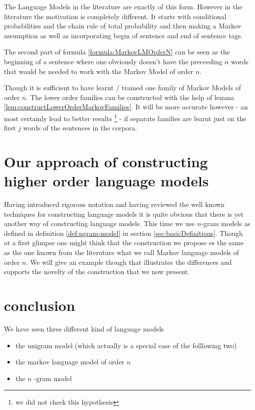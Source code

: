\documentclass[•]{book}
\begin{document}
\begin{remark}
The Language Models in the literature are exactly of this form.
However in the literature the motivation is completely different. 
It starts with conditional probabilities and the chain rule of total probability and then making a Markov assumption as well as incorporating begin of sentence and end of sentence tags. 

The second part of formula \ref{formula:MarkovLMOrderN} can be seen as the beginning of a sentence where one obviously doesn't have the preceeding $n$ words that would be needed to work with the Markov Model of order $n$. 

Though it is sufficient to have learnt / trained  one family of Markov Models of order $n$. 
The lower order families can be constructed with the help of lemma \ref{lem:constructLowerOrderMarkovFamilies}. 
It will be more accurate however - an most certainly lead to better results \footnote{we did not check this hypothesis} - if separate families are learnt just on the first $j$ words of the sentences in the corpora.  


\end{remark}




\section{Our approach of constructing higher order language models}
Having introduced rigorous notation and having reviewed the well known techniques for constructing language models it is quite obvious that there is yet another way of constructing language models. 
This time we use $n$-gram models as defined in definition \ref{def:ngram-model} in section \ref{sec:basicDefinitions}. 
Though at a first glimpse one might think that the construction we propose es the same as the one known from the literature what we call Markov language models of order $n$. 
We will give an example though that illustrates the differences and supports the novelty of the construction that we now present.

\section{conclusion}
We have seen three different kind of language models
\begin{itemize}
\item the unigram model (which actually is a special case of the folllowing two)
\item  the markov language model of order $n$
\item the $n$ -gram  model 
\end{itemize}
\end{document}
